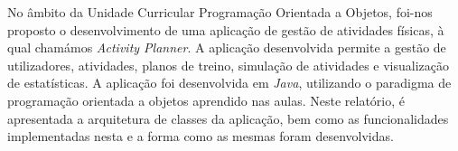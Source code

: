 \documentclass[a4paper,12pt]{scrreprt}
\begin{document}



\makecover



\renewenvironment{abstract}
 {\par\noindent\textbf{\Large\abstractname}\par\bigskip}
 {}

\begin{flushleft}
\begin{abstract}
    No âmbito da Unidade Curricular Programação Orientada a Objetos, foi-nos proposto o 
    desenvolvimento de uma aplicação de gestão de atividades físicas, à qual chamámos \textit{Activity Planner}. 
    A aplicação desenvolvida permite a gestão de utilizadores, atividades, planos de treino, simulação de atividades e 
    visualização de estatísticas. A aplicação foi desenvolvida em \textit{Java}, utilizando o paradigma de programação 
    orientada a objetos aprendido nas aulas. Neste relatório, é apresentada a arquitetura de classes da aplicação, bem 
    como as funcionalidades implementadas nesta e a forma como as mesmas foram desenvolvidas.
\end{abstract}
\end{flushleft}



\renewcommand{\contentsname}{Índice}

\tableofcontents
\end{document}
